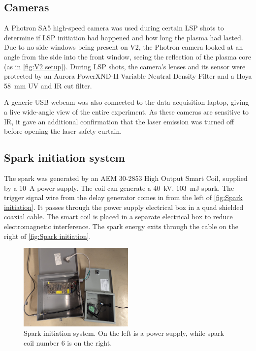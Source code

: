         \subsection{Cameras}

            A Photron SA5 high-speed camera was used during certain LSP shots to determine if LSP initiation had happened and how long the plasma had lasted. Due to no side windows being present on V2, the Photron camera looked at an angle from the side into the front window, seeing the reflection of the plasma core (as in \autoref{fig:V2 setup}). During LSP shots, the camera's lenses and its sensor were protected by an Aurora PowerXND-II Variable Neutral Density Filter and a Hoya \qty{58}{mm} UV and IR cut filter.

            A generic USB webcam was also connected to the data acquisition laptop, giving a live wide-angle view of the entire experiment. As these cameras are sensitive to IR, it gave an additional confirmation that the laser emission was turned off before opening the laser safety curtain.

        \subsection{Spark initiation system}

            The spark was generated by an AEM 30-2853 High Output Smart Coil, supplied by a \qty{10}{A} power supply. The coil can generate a \qty{40}{kV}, \qty{103}{mJ} spark. The trigger signal wire from the delay generator comes in from the left of \autoref{fig:Spark initiation}. It passes through the power supply electrical box in a quad shielded coaxial cable. The smart coil is placed in a separate electrical box to reduce electromagnetic interference. The spark energy exits through the cable on the right of \autoref{fig:Spark initiation}. 

            \begin{figure}[!ht]
                \centering
                \includegraphics[width=0.50\textwidth]{assets/3 design/Spark initiation system.jpg}
                \caption{Spark initiation system. On the left is a power supply, while spark coil number 6 is on the right.}
                \label{fig:Spark initiation}
            \end{figure}

